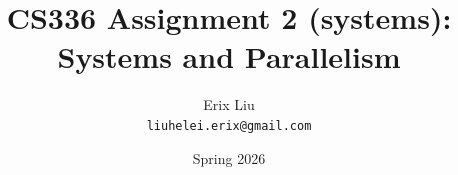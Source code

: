 \documentclass[11pt, a4paper]{article}
\title{%
    CS336 Assignment 2 (systems): \\
    Systems and Parallelism
}
\author{Erix Liu \\ \texttt{liuhelei.erix@gmail.com}}
\date{Spring 2026}
\begin{document}
\maketitle
\thispagestyle{empty}

\tableofcontents
\newpage


\FloatBarrier

\FloatBarrier

\FloatBarrier

\FloatBarrier

\FloatBarrier

\FloatBarrier

\FloatBarrier

\FloatBarrier

\FloatBarrier


\clearpage
\begin{appendices}


\end{appendices}
\end{document}
